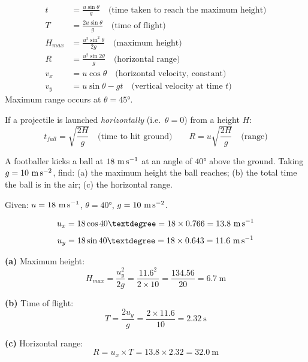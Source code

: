 \begin{lawbox}
\begin{align*}
  t &= \frac{u\sin\theta}{g}
  \quad \text{(time taken to reach the maximum height)}\\[6pt]
  T &= \frac{2u\sin\theta}{g}
  \quad \text{(time of flight)}\\[6pt]
  H_{max} &= \frac{u^2\sin^2\theta}{2g}
  \quad \text{(maximum height)}\\[6pt]
  R &= \frac{u^2\sin 2\theta}{g}
  \quad \text{(horizontal range)}\\[6pt]
  v_x &= u\cos\theta
  \quad \text{(horizontal velocity, constant)}\\[6pt]
  v_y &= u\sin\theta - gt
  \quad \text{(vertical velocity at time } t\text{)}
\end{align*}
Maximum range occurs at $\theta = 45°$.
\end{lawbox}

\begin{lawbox}
If a projectile is launched \textit{horizontally} (i.e.\
$\theta = 0$) from a height $H$:
\[
  t_{fall} = \sqrt{\frac{2H}{g}}
  \quad \text{(time to hit ground)}
  \qquad
  R = u\sqrt{\frac{2H}{g}}
  \quad \text{(range)}
\]
\end{lawbox}

\begin{examplebox}[3.6]
A footballer kicks a ball at $18\ \text{m\,s}^{-1}$ at
an angle of $40°$ above the ground. Taking
$g = 10\ \text{m\,s}^{-2}$, find:
(a) the maximum height the ball reaches;
(b) the total time the ball is in the air;
(c) the horizontal range.
\end{examplebox}

\begin{solutionbox}
Given: $u = 18\ \text{m\,s}^{-1}$, $\theta = 40°$,
$g = 10\ \text{m\,s}^{-2}$.

\[
  u_x = 18\cos 40° = 18 \times 0.766 = 13.8\ \text{m\,s}^{-1}
\]
\[
  u_y = 18\sin 40° = 18 \times 0.643 = 11.6\ \text{m\,s}^{-1}
\]

\textbf{(a)} Maximum height:
\[
  H_{max} = \frac{u_y^2}{2g}
  = \frac{11.6^2}{2 \times 10}
  = \frac{134.56}{20} = 6.7\ \text{m}
\]

\textbf{(b)} Time of flight:
\[
  T = \frac{2u_y}{g}
  = \frac{2 \times 11.6}{10} = 2.32\ \text{s}
\]

\textbf{(c)} Horizontal range:
\[
  R = u_x \times T = 13.8 \times 2.32 = 32.0\ \text{m}
\]
\end{solutionbox}

